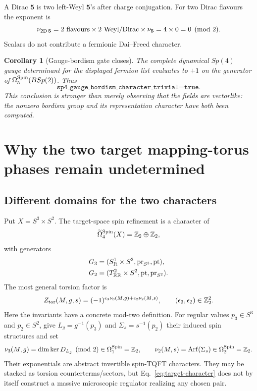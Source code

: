 \documentclass[11pt]{article}
\newtheorem{corollary}[theorem]{Corollary}
\theoremstyle{definition}
\theoremstyle{remark}
\newcommand{\ZZ}{\mathbb Z}
\begin{document}
A Dirac \(\bm5\) is two left-Weyl \(\bm5\)'s after charge conjugation.
For two Dirac flavours the exponent is
\begin{equation}
 \nu_{2{\rm D}\,\bm5}
 =2\ {\rm flavours}\times2\ {\rm Weyl/Dirac}\times\nu_{\bm5}
 =4\times0=0\pmod2.
 \label{eq:dirac-character}
\end{equation}
Scalars do not contribute a fermionic Dai--Freed character.

\begin{corollary}[Gauge-bordism gate closes]
The complete dynamical \(Sp(4)\) gauge determinant for the displayed
fermion list evaluates to \(+1\) on the generator of
\(\Omega_5^{\rm Spin}(BSp(2))\).  Thus
\begin{equation}
 \texttt{sp4\_gauge\_bordism\_character\_trivial=true}.
 \label{eq:gauge-gate-closed}
\end{equation}
This conclusion is stronger than merely observing that the fields are
vectorlike: the nonzero bordism group and its representation character have
both been computed.
\end{corollary}

\section{Why the two target mapping-torus phases remain undetermined}

\subsection{Different domains for the two characters}

Put \(X=S^3\times S^2\).  The target-space spin refinement is a character
of
\begin{equation}
 \widetilde\Omega_4^{\rm Spin}(X)=\ZZ_2\oplus\ZZ_2,
 \label{eq:target-bordism}
\end{equation}
with generators
\begin{align}
 G_3&=(S^1_{\rm R}\times S^3,\operatorname{pr}_{S^3},{\rm pt}),
 \label{eq:G3}\\
 G_2&=(T^2_{\rm RR}\times S^2,{\rm pt},\operatorname{pr}_{S^2}).
 \label{eq:G2}
\end{align}
The most general torsion factor is
\begin{equation}
 Z_{\rm tor}(M,g,s)=(-1)^{\epsilon_3\nu_3(M,g)+
                              \epsilon_2\nu_2(M,s)},
 \qquad(\epsilon_3,\epsilon_2)\in\ZZ_2^2.
 \label{eq:target-character}
\end{equation}
Here the invariants have a concrete mod-two definition.  For regular values
\(p_3\in S^3\) and \(p_2\in S^2\), give
\(L_g=g^{-1}(p_3)\) and \(\Sigma_s=s^{-1}(p_2)\) their induced spin
structures and set
\begin{equation}
 \nu_3(M,g)=\dim\ker D_{L_g}\pmod2\in\Omega_1^{\rm Spin}=\ZZ_2,
 \qquad
 \nu_2(M,s)=\operatorname{Arf}(\Sigma_s)\in
 \Omega_2^{\rm Spin}=\ZZ_2.
 \label{eq:target-mod2-definitions}
\end{equation}
Their exponentials are abstract invertible spin-TQFT characters.  They may
be stacked as torsion counterterms/sectors, but Eq.~\eqref{eq:target-character}
does not by itself construct a massive microscopic regulator realizing any
chosen pair.
\end{document}
